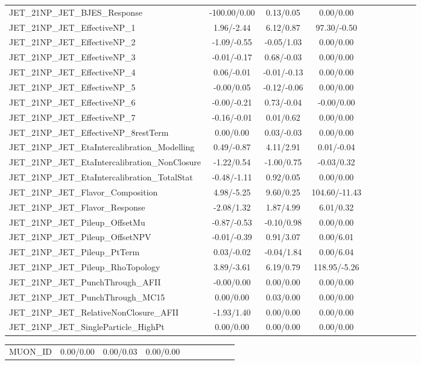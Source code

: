 \begin{table}[h]
\begin{center}
\begin{tabular}{l|ccccccccc}
JET\_21NP\_JET\_BJES\_Response &-100.00/0.00 &0.13/0.05 &0.00/0.00 \\
JET\_21NP\_JET\_EffectiveNP\_1 &1.96/-2.44 &6.12/0.87 &97.30/-0.50 \\
JET\_21NP\_JET\_EffectiveNP\_2 &-1.09/-0.55 &-0.05/1.03 &0.00/0.00 \\
JET\_21NP\_JET\_EffectiveNP\_3 &-0.01/-0.17 &0.68/-0.03 &0.00/0.00 \\
JET\_21NP\_JET\_EffectiveNP\_4 &0.06/-0.01 &-0.01/-0.13 &0.00/0.00 \\
JET\_21NP\_JET\_EffectiveNP\_5 &-0.00/0.05 &-0.12/-0.06 &0.00/0.00 \\
JET\_21NP\_JET\_EffectiveNP\_6 &-0.00/-0.21 &0.73/-0.04 &-0.00/0.00 \\
JET\_21NP\_JET\_EffectiveNP\_7 &-0.16/-0.01 &0.01/0.62 &0.00/0.00 \\
JET\_21NP\_JET\_EffectiveNP\_8restTerm &0.00/0.00 &0.03/-0.03 &0.00/0.00 \\
JET\_21NP\_JET\_EtaIntercalibration\_Modelling &0.49/-0.87 &4.11/2.91 &0.01/-0.04 \\
JET\_21NP\_JET\_EtaIntercalibration\_NonClosure &-1.22/0.54 &-1.00/0.75 &-0.03/0.32 \\
JET\_21NP\_JET\_EtaIntercalibration\_TotalStat &-0.48/-1.11 &0.92/0.05 &0.00/0.00 \\
JET\_21NP\_JET\_Flavor\_Composition &4.98/-5.25 &9.60/0.25 &104.60/-11.43 \\
JET\_21NP\_JET\_Flavor\_Response &-2.08/1.32 &1.87/4.99 &6.01/0.32 \\
JET\_21NP\_JET\_Pileup\_OffsetMu &-0.87/-0.53 &-0.10/0.98 &0.00/0.00 \\
JET\_21NP\_JET\_Pileup\_OffsetNPV &-0.01/-0.39 &0.91/3.07 &0.00/6.01 \\
JET\_21NP\_JET\_Pileup\_PtTerm &0.03/-0.02 &-0.04/1.84 &0.00/6.04 \\
JET\_21NP\_JET\_Pileup\_RhoTopology &3.89/-3.61 &6.19/0.79 &118.95/-5.26 \\
JET\_21NP\_JET\_PunchThrough\_AFII &-0.00/0.00 &0.00/0.00 &0.00/0.00 \\
JET\_21NP\_JET\_PunchThrough\_MC15 &0.00/0.00 &0.03/0.00 &0.00/0.00 \\
JET\_21NP\_JET\_RelativeNonClosure\_AFII &-1.93/1.40 &0.00/0.00 &0.00/0.00 \\
JET\_21NP\_JET\_SingleParticle\_HighPt &0.00/0.00 &0.00/0.00 &0.00/0.00 \\
\hline \end{tabular} \end{center} \end{table} \begin{table}[h] \scriptsize \begin{center} \begin{tabular}{l|ccccccccc} \hline MUON\_ID &0.00/0.00 &0.00/0.03 &0.00/0.00 \\

\end{tabular}
\end{center}
\end{table}
